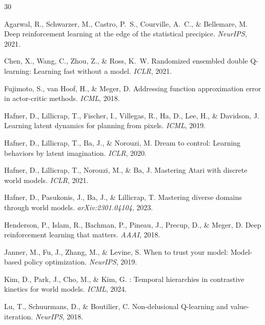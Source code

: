 \documentclass[10pt,letterpaper]{article}
\begin{document}
\begin{thebibliography}{30}

Agarwal, R., Schwarzer, M., Castro, P.~S., Courville, A.~C., \& Bellemare, M.
\newblock Deep reinforcement learning at the edge of the statistical precipice.
\newblock \emph{NeurIPS}, 2021.

Chen, X., Wang, C., Zhou, Z., \& Ross, K.~W.
\newblock Randomized ensembled double {Q}-learning: Learning fast without a model.
\newblock \emph{ICLR}, 2021.

Fujimoto, S., van Hoof, H., \& Meger, D.
\newblock Addressing function approximation error in actor-critic methods.
\newblock \emph{ICML}, 2018.

Hafner, D., Lillicrap, T., Fischer, I., Villegas, R., Ha, D., Lee, H., \& Davidson, J.
\newblock Learning latent dynamics for planning from pixels.
\newblock \emph{ICML}, 2019.

Hafner, D., Lillicrap, T., Ba, J., \& Norouzi, M.
\newblock Dream to control: Learning behaviors by latent imagination.
\newblock \emph{ICLR}, 2020.

Hafner, D., Lillicrap, T., Norouzi, M., \& Ba, J.
\newblock Mastering {A}tari with discrete world models.
\newblock \emph{ICLR}, 2021.

Hafner, D., Pasukonis, J., Ba, J., \& Lillicrap, T.
\newblock Mastering diverse domains through world models.
\newblock \emph{arXiv:2301.04104}, 2023.

Henderson, P., Islam, R., Bachman, P., Pineau, J., Precup, D., \& Meger, D.
\newblock Deep reinforcement learning that matters.
\newblock \emph{AAAI}, 2018.

Janner, M., Fu, J., Zhang, M., \& Levine, S.
\newblock When to trust your model: Model-based policy optimization.
\newblock \emph{NeurIPS}, 2019.

Kim, D., Park, J., Cho, M., \& Kim, G.
: Temporal hierarchies in contrastive kinetics for world models.
\newblock \emph{ICML}, 2024.

Lu, T., Schuurmans, D., \& Boutilier, C.
\newblock Non-delusional {Q}-learning and value-iteration.
\newblock \emph{NeurIPS}, 2018.


\end{thebibliography}
\end{document}
